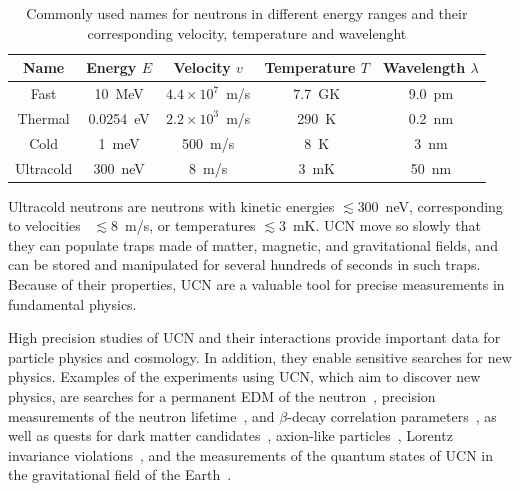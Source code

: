 \begin{table}
  \centering
  \begin{tabular}{|c|c|c|c|c|}
    \hline
    Name & Energy $E$ & Velocity $v$ & Temperature $T$ & Wavelength $\lambda$ \\
    \hline
    \hline
    Fast & 10~MeV & $4.4 \times 10^7$~m/s & $7.7$~GK & 9.0~pm \\
    \hline
    Thermal & 0.0254~eV & $ 2.2 \times 10^3$~m/s & 290~K & 0.2~nm \\
    \hline
    Cold & 1~meV & 500~m/s & 8~K & 3~nm \\
    \hline
    Ultracold & 300~neV & 8~m/s & 3~mK & 50~nm \\
    \hline
  \end{tabular}
  \caption[Neutron names in different energy ranges and their
  corresponding velocities, temperatures, and wavelength]{Commonly
    used names for neutrons in different energy ranges and their
    corresponding velocity, temperature and
    wavelenght \label{tab:ucnenergy}}
\end{table}


Ultracold neutrons are neutrons with kinetic energies $\lesssim 300$~neV,
corresponding to velocities ~$\lesssim 8$~m/s, or temperatures
$\lesssim 3$~mK. UCN move so slowly that they can populate traps made
of matter, magnetic, and gravitational fields, and can be stored and
manipulated for several hundreds of seconds in such traps. Because of
their properties, UCN are a valuable tool for precise measurements in
fundamental physics.

High precision studies of UCN and their interactions provide important
data for particle physics and cosmology. In addition, they enable
sensitive searches for new physics. Examples of the experiments using
UCN, which aim to discover new physics, are searches for a permanent
EDM of the
neutron~\cite{Baker2006,Serebrov2009,Lam_Gol,Altarev2010,Pendlebury2015},
precision measurements of the neutron
lifetime~\cite{pattie2018measurement,Paul2009,Wietfeldt2011,Arzumanov2000,Serebrov2005,Huffman},
and $\beta$-decay correlation
parameters~\cite{plaster2012measurement,Mendenhall,Broussard}, as well
as quests for dark matter candidates~\cite{Serebrov2008,Zimmer2010},
axion-like particles~\cite{Baessler,Serebrov2010,Afach2015}, Lorentz
invariance violations~\cite{Altarev2009}, and the measurements of the
quantum states of UCN in the gravitational field of the
Earth~\cite{Nesvizhevsky2003}.

